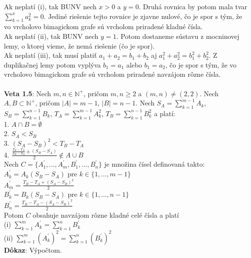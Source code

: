 \documentclass[12pt]{article}
\begin{document}
Ak neplatí (i), tak BUNV nech $x > 0$ a $y = 0$. Druhá rovnica by potom mala tvar $\sum_{k=1}^{x} a^2_k = 0$. Jediné riešenie tejto rovnice je zjavne nulové, čo je spor s tým, že vo vrcholovo bimagickom grafe sú vrcholom priradené kladné čísla.  \\

Ak neplatí (ii), tak BUNV nech $y = 1$. Potom dostaneme sústavu z mocninovej lemy, o ktorej vieme, že nemá riešenie (čo je spor). \\

Ak neplatí (iii), tak musí platiť $a_1 + a_2 = b_1 + b_2$ aj $a^2_1 + a^2_2 = b^2_1 + b^2_2$. Z duplikačnej lemy potom vyplýva $b_1 = a_1$ alebo $b_1 = a_2$,  čo je spor s tým, že vo vrcholovo bimagickom grafe sú vrcholom priradené navzájom rôzne čísla. \\\\

\textbf{Veta 1.5}: Nech $m,n \in \mathbb{N^+}$, pričom $m,n \geq 2$ a $(m, n) \neq (2, 2)$. Nech $A,B \subset \mathbb{N^+}$, pričom $|A| = m - 1$, $|B| = n - 1$. Nech $S_A = \sum_{k=1}^{m-1} A_k$, $S_B = \sum_{k=1}^{n-1} B_k$, $T_A = \sum_{k=1}^{m-1} A^2_k$,  $T_B = \sum_{k=1}^{n-1} B^2_k$ a platí: \\
1. $A \cap B = \emptyset$ \\
2. $S_A < S_B$ \\
3. $(S_A - S_B)^2 < T_B - T_A$ \\
4. $\frac{\frac{T_B - T_A}{S_B - S_A} \pm (S_B - S_A)}{2} \notin A \cup B$ \\

Nech $C = \{A^\prime_1, ... , A^\prime_m, B^\prime_1, ... , B^\prime_n\}$ je množina čísel definovaná takto: \\
$A^\prime_k = A_k (S_B - S_A)$ pre $k \in \{1, ... , m-1\}$ \\
$A^\prime_m = \frac{T_B - T_A + (S_A - S_B)^2}{2}$ \\
$B^\prime_k = B_k (S_B - S_A)$ pre $k \in \{1, ... , n-1\}$ \\
$B^\prime_n = \frac{T_B - T_A - (S_A - S_B)^2}{2}$ \\

Potom $C$ obsahuje navzájom rôzne kladné celé čísla a platí \\
(i) $\sum_{k=1}^{m} A^\prime_k = \sum_{k=1}^{n} B^\prime_k$ \\
(ii) $\sum_{k=1}^{m} (A^\prime_k)^2 = \sum_{k=1}^{n} (B^\prime_k)^2$ \\

\textbf{Dôkaz}: Výpočtom. \\
\end{document}
